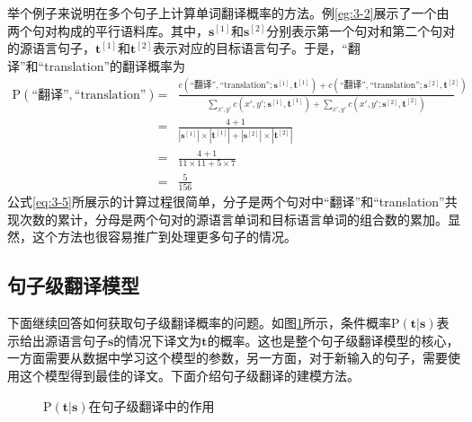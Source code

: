 \parinterval 举个例子来说明在多个句子上计算单词翻译概率的方法。例\ref{eg:3-2}展示了一个由两个句对构成的平行语料库。其中，$\mathbf{s}^{[1]}$和$\mathbf{s}^{[2]}$分别表示第一个句对和第二个句对的源语言句子，$\mathbf{t}^{[1]}$和$\mathbf{t}^{[2]}$表示对应的目标语言句子。于是，``翻译''和``translation''的翻译概率为
{\small
\begin{eqnarray}
{\textrm{P}(\textrm{``翻译''},\textrm{``translation''})} & = & {\frac{c(\textrm{``翻译''},\textrm{``translation''};\mathbf{s}^{[1]},\mathbf{t}^{[1]})+c(\textrm{``翻译''},\textrm{``translation''};\mathbf{s}^{[2]},\mathbf{t}^{[2]})}{\sum_{x',y'} c(x',y';\mathbf{s}^{[1]},\mathbf{t}^{[1]}) + \sum_{x',y'} c(x',y';\mathbf{s}^{[2]},\mathbf{t}^{[2]})}} \nonumber \\
                                                                            & = & \frac{4 + 1}{|\mathbf{s}^{[1]}| \times |\mathbf{t}^{[1]}| + |\mathbf{s}^{[2]}| \times |\mathbf{t}^{[2]}|} \nonumber \\
                                                                            & = & \frac{4 + 1}{11 \times 11 + 5 \times 7} \nonumber \\
                                                                            & = & \frac{5}{156}
\label{eq:3-5}
\end{eqnarray}
}
\parinterval 公式\ref{eq:3-5}所展示的计算过程很简单，分子是两个句对中``翻译''和``translation''共现次数的累计，分母是两个句对的源语言单词和目标语言单词的组合数的累加。显然，这个方法也很容易推广到处理更多句子的情况。


\subsection{句子级翻译模型}
\label{sec:sentence-level-translation}

\parinterval 下面继续回答如何获取句子级翻译概率的问题。如图\ref{fig:3-6}所示，条件概率$\textrm{P}(\mathbf{t}|\mathbf{s})$表示给出源语言句子$\mathbf{s}$的情况下译文为$\mathbf{t}$的概率。这也是整个句子级翻译模型的核心，一方面需要从数据中学习这个模型的参数，另一方面，对于新输入的句子，需要使用这个模型得到最佳的译文。下面介绍句子级翻译的建模方法。

\begin{figure}[htp]
    \centering

    \caption{$\textrm{P}(\mathbf{t}|\mathbf{s})$在句子级翻译中的作用}
    \label{fig:3-6}
\end{figure}

